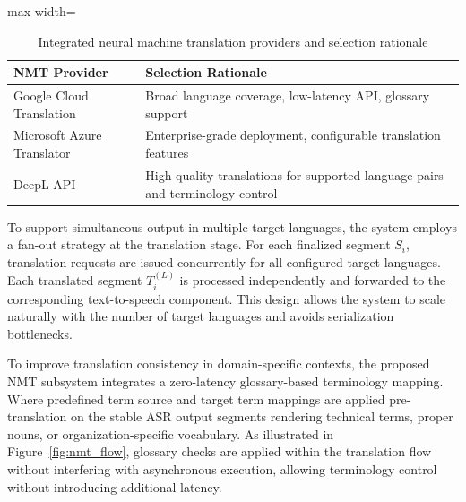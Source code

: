 \begin{table}[!htbp]
  \centering
  \caption[Integrated NMT providers and selection rationale]{Integrated neural machine translation providers and selection rationale}
  \label{tab:nmt_providers}
  \begin{adjustbox}{max width=\textwidth}
    \begin{tabular}{p{4.5cm} p{11.8cm}}
      \toprule
      \textbf{NMT Provider} & \textbf{Selection Rationale} \\
      \midrule
      Google Cloud Translation\footnotemark & Broad language coverage, low-latency API, glossary support \\
      \midrule
      Microsoft Azure Translator\footnotemark & Enterprise-grade deployment, configurable translation features \\
      \midrule
      DeepL API\footnotemark & High-quality translations for supported language pairs and terminology control\\
      \bottomrule
    \end{tabular}
  \end{adjustbox}
\end{table}

\addtocounter{footnote}{-2} 



To support simultaneous output in multiple target languages, the system employs a fan-out strategy at the translation stage. For each finalized segment $S_i$, translation requests are issued concurrently for all configured target languages. Each translated segment $T_i^{(L)}$ is processed independently and forwarded to the corresponding text-to-speech component. This design allows the system to scale naturally with the number of target languages and avoids serialization bottlenecks.

To improve translation consistency in domain-specific contexts, the proposed NMT subsystem integrates a zero-latency  glossary-based terminology mapping. Where predefined term source and target term mappings are applied pre-translation on the stable ASR output segments rendering technical terms, proper nouns, or organization-specific vocabulary. As illustrated in Figure~\ref{fig:nmt_flow}, glossary checks are applied within the translation flow without interfering with asynchronous execution, allowing terminology control without introducing additional latency.



